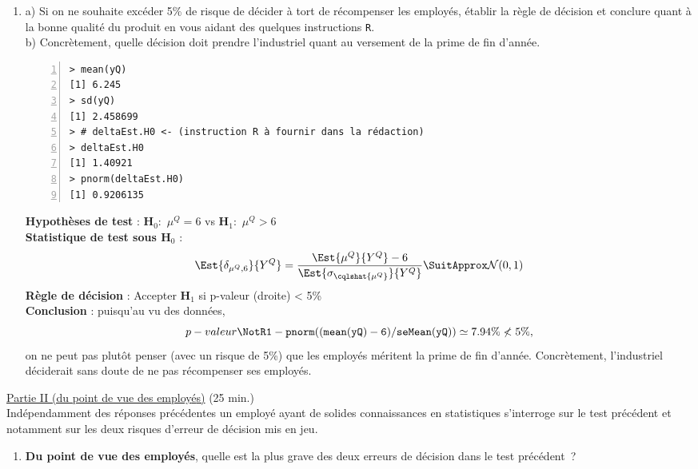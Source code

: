 \documentclass[10pt]{report}
\begin{document}
\begin{exercice}
\begin{enumerate}
\item a) Si on ne souhaite exc{\'e}der 5\% de risque de d{\'e}cider {\`a} tort de r{\'e}compenser les employ{\'e}s, {\'e}tablir la r{\`e}gle de d{\'e}cision et conclure quant {\`a} la bonne qualit{\'e} du produit en vous aidant des quelques instructions \texttt{R}. \\
b) Concr{\`e}tement, quelle d{\'e}cision doit prendre l'industriel quant au versement de la prime de fin d'ann{\'e}e.

\IndicR
\begin{Verbatim}[frame=leftline,fontfamily=tt,fontshape=n,numbers=left]
> mean(yQ)
[1] 6.245
> sd(yQ)
[1] 2.458699
> # deltaEst.H0 <- (instruction R à fournir dans la rédaction)
> deltaEst.H0
[1] 1.40921
> pnorm(deltaEst.H0)
[1] 0.9206135
\end{Verbatim}

 

\begin{Correction}

\noindent \textbf{Hypothèses de test} : $\mathbf{H}_0:$ $\mu^{Q}=6$ vs {\large $\mathbf{H}_1:$ $\mu^{Q}>6$}\\
\textbf{Statistique de test sous $\mathbf{H}_0$} :
  $$
  \Est{\delta_{\mu^{Q},6}}{Y^{Q}}= {\displaystyle \frac{\Est{\mu^{Q}}{Y^{Q}}-6}{
\Est{\sigma_{\cqlshat{\mu^{Q}}}}{Y^{Q}}
}} 
  \SuitApprox \mathcal{N}(0,1)
  $$
\textbf{Règle de décision} : Accepter $\mathbf{H}_1$ si 
  p-valeur (droite) < 5\%\\
\noindent \textbf{Conclusion} :
puisqu'au vu des données, 
  \[
p-valeur\NotR\mathtt{1-pnorm((mean(yQ)-6)/seMean(yQ))} \simeq 7.94\%\nless5\%,
\]
on ne peut pas plutôt penser (avec un risque de 5\%) que les employés méritent la prime de fin d'année.
Concrètement, l'industriel déciderait sans doute de ne pas récompenser ses employés.
\end{Correction}



\end{enumerate}

\noindent \underline{Partie II (du point de vue des employ{\'e}s)} (25 min.) \\

Ind{\'e}pendamment des r{\'e}ponses pr{\'e}c{\'e}dentes un employ{\'e} ayant de solides connaissances en statistiques s'interroge sur le test pr{\'e}c{\'e}dent et notamment sur les deux risques d'erreur de d{\'e}cision mis en jeu. 

\begin{enumerate}
\item \textbf{Du point de vue des employ{\'e}s}, quelle est la plus grave des deux erreurs de d{\'e}cision dans le test pr{\'e}c{\'e}dent~?



\end{enumerate}
\end{exercice}
\end{document}
